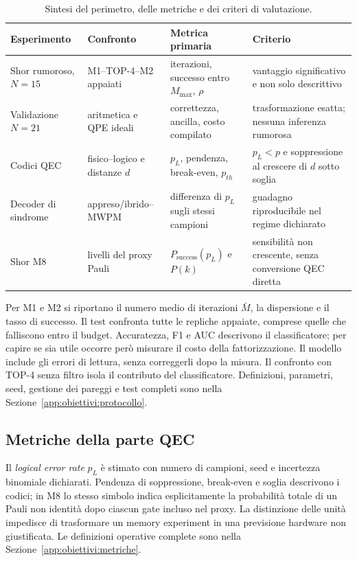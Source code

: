 \begin{onehalfspace}
\begin{table}[H]
\centering
\small
\begin{tabularx}{\textwidth}{@{}lXXX@{}}
\toprule
\textbf{Esperimento} & \textbf{Confronto} & \textbf{Metrica primaria} & \textbf{Criterio} \\
\midrule
Shor rumoroso, $N=15$ & M1--TOP-4--M2 appaiati & iterazioni, successo entro $M_{\max}$, $\rho$ & vantaggio significativo e non solo descrittivo \\
Validazione $N=21$ & aritmetica e QPE ideali & correttezza, ancilla, costo compilato & trasformazione esatta; nessuna inferenza rumorosa \\
Codici QEC & fisico--logico e distanze $d$ & $p_L$, pendenza, break-even, $p_{th}$ & $p_L<p$ e soppressione al crescere di $d$ sotto soglia \\
Decoder di sindrome & appreso/ibrido--\ac{MWPM} & differenza di $p_L$ sugli stessi campioni & guadagno riproducibile nel regime dichiarato \\
Shor M8 & livelli del proxy Pauli & $P_{\mathrm{success}}(p_L)$ e $P(k)$ & sensibilità non crescente, senza conversione QEC diretta \\
\bottomrule
\end{tabularx}
\caption{Sintesi del perimetro, delle metriche e dei criteri di valutazione.}
\label{tab:contratto_sintesi}
\end{table}

Per M1 e M2 si riportano il numero medio di iterazioni $\bar{M}$, la dispersione e il tasso di successo. Il test confronta tutte le repliche appaiate, comprese quelle che falliscono entro il budget. Accuratezza, F1 e AUC descrivono il classificatore; per capire se sia utile occorre però misurare il costo della fattorizzazione. Il modello include gli errori di lettura, senza correggerli dopo la misura. Il confronto con TOP-4 senza filtro isola il contributo del classificatore. Definizioni, parametri, seed, gestione dei pareggi e test completi sono nella Sezione~\ref{app:obiettivi:protocollo}.

\subsection{Metriche della parte QEC}
\label{subsec:metriche_qec}

Il \textit{logical error rate} $p_L$ è stimato con numero di campioni, seed e incertezza binomiale dichiarati. Pendenza di soppressione, break-even e soglia descrivono i codici; in M8 lo stesso simbolo indica esplicitamente la probabilità totale di un Pauli non identità dopo ciascun gate incluso nel proxy. La distinzione delle unità impedisce di trasformare un memory experiment in una previsione hardware non giustificata. Le definizioni operative complete sono nella Sezione~\ref{app:obiettivi:metriche}.


\end{onehalfspace}
